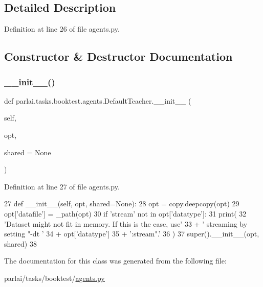 \subsection{Detailed Description}


Definition at line 26 of file agents.\+py.



\subsection{Constructor \& Destructor Documentation}
\mbox{\label{classparlai_1_1tasks_1_1booktest_1_1agents_1_1DefaultTeacher_a22c8ec41b8b29da86546fe666a3016b0}} 
\subsubsection{\texorpdfstring{\+\_\+\+\_\+init\+\_\+\+\_\+()}{\_\_init\_\_()}}
{\footnotesize\ttfamily def parlai.\+tasks.\+booktest.\+agents.\+Default\+Teacher.\+\_\+\+\_\+init\+\_\+\+\_\+ (\begin{DoxyParamCaption}\item[{}]{self,  }\item[{}]{opt,  }\item[{}]{shared = {\ttfamily None} }\end{DoxyParamCaption})}



Definition at line 27 of file agents.\+py.


\begin{DoxyCode}
27     \textcolor{keyword}{def }\_\_init\_\_(self, opt, shared=None):
28         opt = copy.deepcopy(opt)
29         opt[\textcolor{stringliteral}{'datafile'}] = \_path(opt)
30         \textcolor{keywordflow}{if} \textcolor{stringliteral}{'stream'} \textcolor{keywordflow}{not} \textcolor{keywordflow}{in} opt[\textcolor{stringliteral}{'datatype'}]:
31             print(
32                 \textcolor{stringliteral}{'Dataset might not fit in memory. If this is the case, use'}
33                 + \textcolor{stringliteral}{' streaming by setting "-dt '}
34                 + opt[\textcolor{stringliteral}{'datatype'}]
35                 + \textcolor{stringliteral}{':stream".'}
36             )
37         super().\_\_init\_\_(opt, shared)
38 \end{DoxyCode}


The documentation for this class was generated from the following file\+:\begin{DoxyCompactItemize}
\item 
parlai/tasks/booktest/\hyperlink{parlai_2tasks_2booktest_2agents_8py}{agents.\+py}\end{DoxyCompactItemize}
